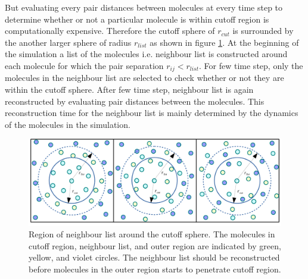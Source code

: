 But evaluating every pair distances between molecules at every time step to determine whether or not a particular molecule is within cutoff region is computationally expensive. Therefore the cutoff sphere of $r_{cut}$ is surrounded by the another larger sphere of radius $r_{list}$ as shown in figure \ref{fig:neighbourList}. At the beginning of the simulation a list of the molecules i.e. neighbour list is constructed around each molecule for which the pair separation $r_{ij} < r_{list}$. For few time step, only the molecules in the neighbour list are selected to check whether or not they are within the cutoff sphere. After few time step, neighbour list is again reconstructed by evaluating pair distances between the molecules. This reconstruction time for the neighbour list is mainly determined by the dynamics of the molecules in the simulation.  
\begin{figure}[tpb]
  \begin{center}
    \centerline{\includegraphics[scale=0.8]{neighbourList.pdf}}
    \caption{Region of neighbour list around the cutoff sphere. The molecules in cutoff region, neighbour list, and outer region are indicated by green, yellow, and violet circles. The neighbour list  should be reconstructed before molecules in the outer region starts to penetrate cutoff region.}
    \label{fig:neighbourList}
  \end{center}
\end{figure}


